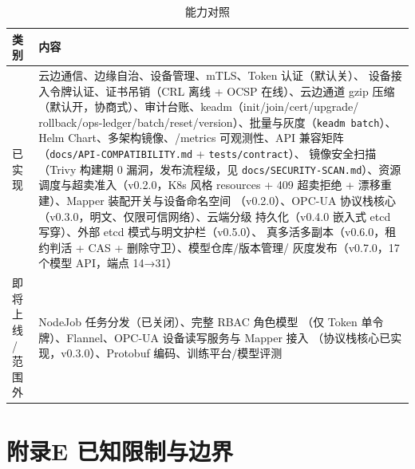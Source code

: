 \begin{table}[htbp]
\centering
\caption{能力对照}
\label{tab:d-compare}
\begin{tabularx}{\textwidth}{l X}
\toprule
\textbf{类别} & \textbf{内容} \\
\midrule
已实现 & 云边通信、边缘自治、设备管理、mTLS、Token 认证（默认关）、
设备接入令牌认证、证书吊销（CRL 离线 + OCSP 在线）、云边通道 gzip
压缩（默认开，协商式）、审计台账、keadm（init/join/cert/upgrade/
rollback/ops-ledger/batch/reset/version）、批量与灰度（\texttt{keadm
batch}）、Helm Chart、多架构镜像、/metrics 可观测性、API 兼容矩阵
（\texttt{docs/API-COMPATIBILITY.md} + \texttt{tests/contract}）、
镜像安全扫描（Trivy 构建期 0 漏洞，发布流程级，见
\texttt{docs/SECURITY-SCAN.md}）、资源调度与超卖准入（v0.2.0，K8s 风格
resources + 409 超卖拒绝 + 漂移重建）、Mapper 装配开关与设备命名空间
（v0.2.0）、OPC-UA 协议栈核心（v0.3.0，明文、仅限可信网络）、云端分级
持久化（v0.4.0 嵌入式 etcd 写穿）、外部 etcd 模式与明文护栏（v0.5.0）、
真多活多副本（v0.6.0，租约判活 + CAS + 删除守卫）、模型仓库/版本管理/
灰度发布（v0.7.0，17 个模型 API，端点 14→31） \\
即将上线 / 范围外 & NodeJob 任务分发（已关闭）、完整 RBAC 角色模型
（仅 Token 单令牌）、Flannel、OPC-UA 设备读写服务与 Mapper 接入
（协议栈核心已实现，v0.3.0）、Protobuf 编码、训练平台/模型评测 \\
\bottomrule
\end{tabularx}
\end{table}

\chapter{附录E 已知限制与边界}
\label{app:E}

